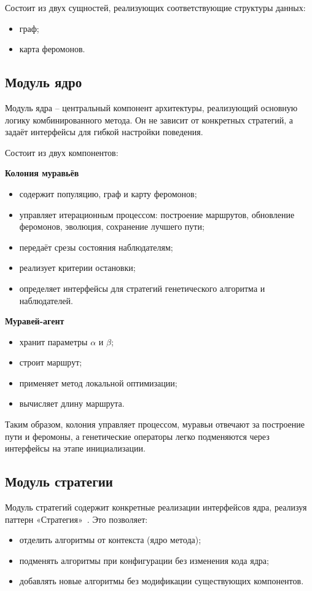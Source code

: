 Состоит из двух сущностей, реализующих соответствующие структуры данных:
\begin{itemize}
	\item граф;
	\item карта феромонов.
\end{itemize}

\subsection{Модуль ядро}

Модуль ядра -- центральный компонент архитектуры, реализующий основную логику комбинированного метода. Он не зависит от конкретных стратегий, а задаёт интерфейсы для гибкой настройки поведения.

Состоит из двух компонентов:

\textbf{Колония муравьёв}
\begin{itemize}
	\item содержит популяцию, граф и карту феромонов;
	\item управляет итерационным процессом: построение маршрутов, обновление феромонов, эволюция, сохранение лучшего пути;
	\item передаёт срезы состояния наблюдателям;
	\item реализует критерии остановки;
	\item определяет интерфейсы для стратегий генетического алгоритма и наблюдателей.
\end{itemize}

\textbf{Муравей-агент}
\begin{itemize}
	\item хранит параметры $\alpha$ и $\beta$;
	\item строит маршрут;
	\item применяет метод локальной оптимизации;
	\item вычисляет длину маршрута.
\end{itemize}

Таким образом, колония управляет процессом, муравьи отвечают за построение пути и феромоны, а генетические операторы легко подменяются через интерфейсы на этапе инициализации.

\subsection{Модуль стратегии}

Модуль стратегий содержит конкретные реализации интерфейсов ядра, реализуя паттерн «Стратегия»~\cite{patterns}. Это позволяет:
\begin{itemize}
	\item отделить алгоритмы от контекста (ядро метода);
	\item подменять алгоритмы при конфигурации без изменения кода ядра;
	\item добавлять новые алгоритмы без модификации существующих компонентов.
\end{itemize}

